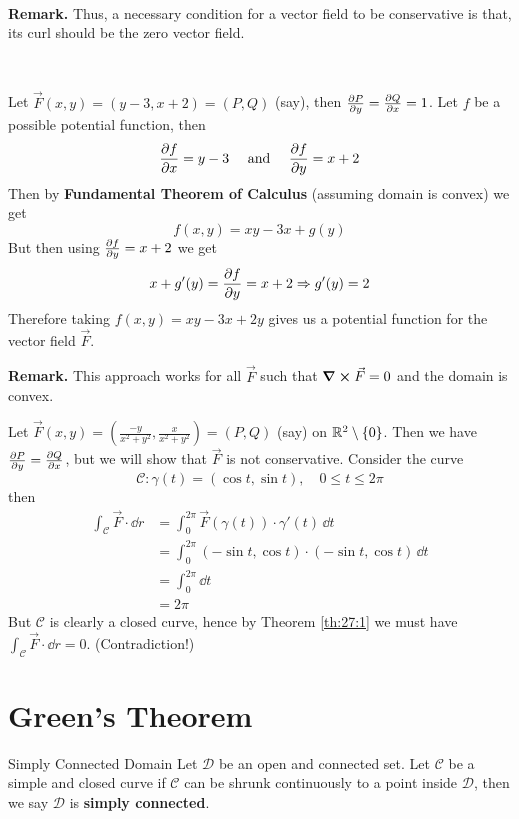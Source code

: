 \documentclass[../Analysis-3.tex]{subfiles}
\begin{document}
\

\textbf{Remark.} Thus, a necessary condition for a vector field to be conservative is that, its curl should be the zero vector field.

\

\begin{Eg}{}{}
  Let $\vec{F}(x,y) = (y-3,x+2) = (P,Q)$ (say), then $\pdv{P}{y} = \pdv{Q}{x} = 1$. Let $f$ be a possible potential function, then
  \[
    \pdv{f}{x} = y-3 \quad \mbox{ and } \quad \pdv{f}{y} = x+2
  \]
  Then by \textbf{Fundamental Theorem of Calculus} (assuming domain is convex) we get
  \[
    f(x,y) = xy - 3x + g(y)
  \]
  But then using $\pdv{f}{y} = x+2$ we get
  \[
    x + g'(y) = \pdv{f}{y} = x+2 \Rightarrow g'(y) = 2
  \]
  Therefore taking $f(x,y) = xy - 3x + 2y$ gives us a potential function for the vector field $\vec{F}$.
\end{Eg}


\textbf{Remark.} This approach works for all $\vec{F}$ such that $\curl \vec{F} = 0$ and the domain is convex.

\begin{Eg}{}{}
  Let $\vec{F}(x,y) = \left( \frac{-y}{x^2+y^2}, \frac{x}{x^2+y^2} \right) = (P,Q)$ (say) on $\mathbb{R}^2 \setminus \{0\}$. Then we have $\pdv{P}{y} = \pdv{Q}{x}$, but we will show that $\vec{F}$ is not conservative. Consider the curve
  \[
    \mathcal{C} : \gamma(t) = ( \cos t, \sin t), \quad 0 \leq t \leq 2\pi
  \]
  then
  \begin{align*}
    \int_{\mathcal{C}} \vec{F} \cdot \dd r
     & = \int_0^{2\pi}  \vec{F}(\gamma(t))\cdot \gamma'(t) \, \dd t        \\
     & = \int_0^{2\pi}  (-\sin t, \cos t) \cdot (-\sin t, \cos t) \, \dd t \\
     & = \int_0^{2\pi} \dd t                                               \\
     & = 2\pi
  \end{align*}
  But $\mathcal{C}$ is clearly a closed curve, hence by Theorem \ref{th:27:1} we must have $\displaystyle\int_{\mathcal{C}} \vec{F} \cdot \dd r = 0$. (Contradiction!)
\end{Eg}

\section{Green's Theorem}

\begin{Def}{Simply Connected Domain}{}
  Let $\mathcal{D}$ be an open and connected set. Let $\mathcal{C}$ be a simple and closed curve if $\mathcal{C}$ can be shrunk continuously to a point inside $\mathcal{D}$, then we say $\mathcal{D}$ is \textbf{simply connected}.
\end{Def}
\end{document}
